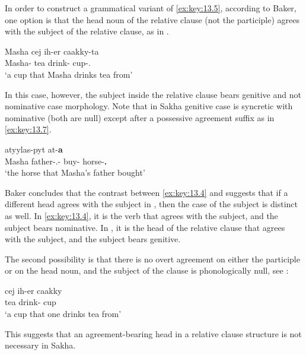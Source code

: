 \documentclass[output=paper]{langsci/langscibook}
\begin{document}
In order to construct a grammatical variant of \eqref{ex:key:13.5}, according to
Baker, one option is that the head noun of the relative clause (not the
participle) agrees with the subject of the relative clause, as in
.

\ea%
    \label{ex:key:13.6} \parencite[30]{Baker2015}
    \sn
    \gll  Masha cej ih-er caakky-ta\\
          Masha-\Gen{}  tea drink-\Aor{}  cup-\Tsg.\Poss{}\\
    \glt  ‘a cup that Masha drinks tea from’
\z

In this case, however, the subject inside the relative clause bears genitive
and not nominative case morphology. Note that in Sakha genitive case is
syncretic with nominative (both are null) except after a possessive agreement
suffix as in \eqref{ex:key:13.7}.

\ea%
    \label{ex:key:13.7} \parencite[30]{Baker2015}
    \sn
     atyylas-pyt at-\textbf{a}\\
          {} Masha father-\Tsg.\Poss{}-\Gen{} {} buy-\Ptcp{}  horse-\textbf{\Tsg.\Poss{}}\\
    \glt  ‘the horse that Masha’s father bought’  \citet[30]{Baker2015}
\z

Baker concludes that the contrast between \eqref{ex:key:13.4} and
 suggests that if a different head agrees with the subject in
, then the case of the subject is distinct as well. In
\eqref{ex:key:13.4}, it is the verb that agrees with the subject, and the
subject bears nominative. In , it is the
head of the relative clause that agrees with the subject, and the subject bears
genitive.

The second possibility is that there is no overt agreement on either the
participle or on the head noun, and the subject of the clause is phonologically
null, see :

\ea%
    \label{ex:key:13.8} \parencite[30]{Baker2015}
    \sn
    \gll    cej ih-er caakky\\
            tea drink-\Aor{}  cup\\
    \glt    ‘a cup that one drinks tea from’
\z

This suggests that an agreement-bearing head in a relative clause structure is
not necessary in Sakha.
\end{document}
